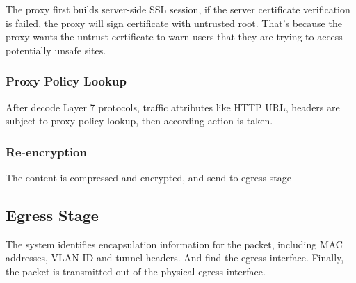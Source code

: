 The proxy first builds server-side SSL session, if the server certificate verification is failed, the proxy will sign certificate with untrusted root. That’s because the proxy wants the untrust certificate to warn users that they are trying to access potentially unsafe sites.

\subsubsection*{\hypertarget{link:Proxy Policy Lookup}{Proxy Policy Lookup}}
\label{sec:appendix_e:sequence:proxy:lookup}

After decode Layer 7 protocols, traffic attributes like HTTP URL, headers are subject to proxy policy lookup, then according action is taken.

\subsubsection*{\hypertarget{link:Re-encryption}{Re-encryption}}
\label{sec:appendix_e:sequence:proxy:re-encryption}

The content is compressed and encrypted, and send to egress stage

\subsection*{\hypertarget{link:Egress Stage}{Egress Stage}}
\label{sec:appendix_e:sequence:egress}

The system identifies encapsulation information for the packet, including MAC addresses, VLAN ID and tunnel headers. And find the egress interface.
Finally, the packet is transmitted out of the physical egress interface.

